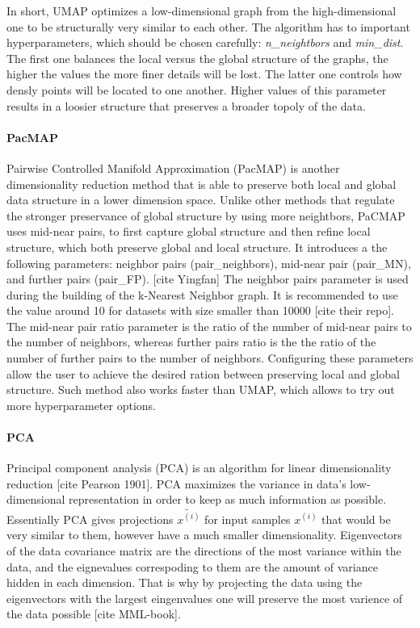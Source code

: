 In short, UMAP optimizes a low-dimensional graph from the high-dimensional one to be structurally very similar to each other. The algorithm has to important hyperparameters, which should be chosen carefully: \textit{n\_neightbors} and \textit{min\_dist}. The first one balances the local versus the global structure of the graphs, the higher the values the more finer details will be lost. The latter one controls how densly points will be located to one another. Higher values of this parameter results in a loosier structure that preserves a broader topoly of the data. 

\paragraph{PacMAP}
Pairwise Controlled Manifold Approximation (PacMAP) is another dimensionality reduction method that is able to preserve both local and global data structure in a lower dimension space. Unlike other methods that regulate the stronger preservance of global structure by using more neightbors, PaCMAP uses mid-near pairs, to first capture global structure and then refine local structure, which both preserve global and local structure. It introduces a the following parameters: neighbor pairs (pair\_neighbors), mid-near pair (pair\_MN), and further pairs (pair\_FP). [cite Yingfan] The neighbor pairs parameter is used during the building of the k-Nearest Neighbor graph. It is recommended to use the value around 10 for datasets with size smaller than 10000 [cite their repo]. The mid-near pair ratio parameter is the ratio of the number of mid-near pairs to the number of neighbors, whereas further pairs ratio is the the ratio of the number of further pairs to the number of neighbors. Configuring these parameters allow the user to achieve the desired ration between preserving local and global structure. Such method also works faster than UMAP, which allows to try out more hyperparameter options.

\paragraph{PCA}
Principal component analysis (PCA) is an algorithm for linear dimensionality reduction [cite Pearson 1901].  PCA maximizes the variance in data's low-dimensional representation in order to keep as much information as possible. Essentially PCA gives projections $\tilde{x^{(i)}}$ for input samples $x^{(i)}$ that would be very similar to them, however have a much smaller dimensionality. Eigenvectors of the data covariance matrix are the directions of the most variance within the data, and the eignevalues correspoding to them are the amount of variance hidden in each dimension. That is why by projecting the data using the eigenvectors with the largest eingenvalues one will preserve the most varience of the data possible [cite MML-book].

